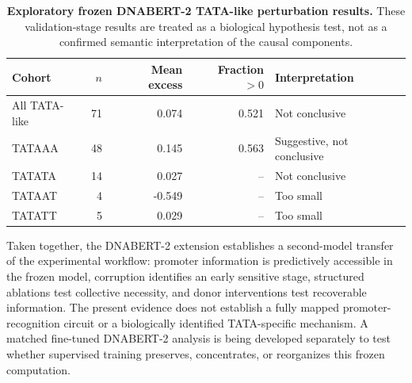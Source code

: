 \begin{table}[t]
    \centering
    \caption{\textbf{Exploratory frozen DNABERT-2 TATA-like perturbation results.}
    These validation-stage results are treated as a biological hypothesis test, not as a confirmed
    semantic interpretation of the causal components.}
    \label{tab:dnabert-tata}
    \small
    \begin{tabular}{lrrrl}
        \toprule
        Cohort & \(n\) & Mean excess & Fraction \(>0\) & Interpretation \\
        \midrule
        All TATA-like & 71 & 0.074 & 0.521 & Not conclusive \\
        TATAAA & 48 & 0.145 & 0.563 & Suggestive, not conclusive \\
        TATATA & 14 & 0.027 & -- & Not conclusive \\
        TATAAT & 4 & -0.549 & -- & Too small \\
        TATATT & 5 & 0.029 & -- & Too small \\
        \bottomrule
    \end{tabular}
\end{table}

Taken together, the DNABERT-2 extension establishes a second-model transfer of the experimental
workflow: promoter information is predictively accessible in the frozen model, corruption identifies an
early sensitive stage, structured ablations test collective necessity, and donor interventions test
recoverable information. The present evidence does not establish a fully mapped promoter-recognition
circuit or a biologically identified TATA-specific mechanism. A matched fine-tuned DNABERT-2 analysis is
being developed separately to test whether supervised training preserves, concentrates, or reorganizes
this frozen computation.
